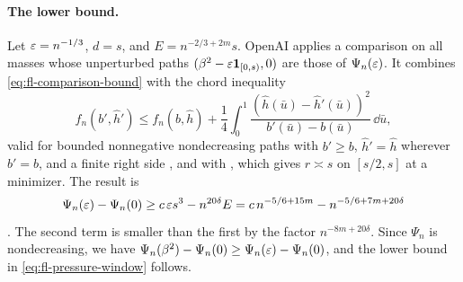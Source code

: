\paragraph{The lower bound.} Let $\varepsilon=n^{-1/3}$, $d=s$, and $E=n^{-2/3+2m}s$. OpenAI applies a comparison on all masses whose unperturbed paths $(\beta^2-\varepsilon\mathbf 1_{[0,s)},0)$ are those of $\Psi_n(\varepsilon)$. It combines \eqref{eq:fl-comparison-bound} with the chord inequality
\[
 f_n(b',{\widehat h}')\le f_n(b,{\widehat h})+\frac14\int_0^1\frac{({\widehat h}({\bar u})-{\widehat h}'({\bar u}))^2}{b'({\bar u})-b({\bar u})}\,\dd {\bar u},
\]
valid for bounded nonnegative nondecreasing paths with $b'\ge b$, ${\widehat h}'={\widehat h}$ wherever $b'=b$, and a finite right side \cite[Lemma~7.1]{oai-fluctuations}, and with \cite[Proposition~6.6]{oai-fluctuations}, which gives $r\asymp s$ on $[s/2,s]$ at a minimizer. The result is
\[
 \Psi_n(\varepsilon)-\Psi_n(0)\ge c\,\varepsilon s^3-n^{20\delta}E=c\,n^{-5/6+15m}-n^{-5/6+7m+20\delta}
\]
\cite[Section~7.1, (30)]{oai-fluctuations}. The second term is smaller than the first by the factor $n^{-8m+20\delta}$. Since $\Psi_n$ is nondecreasing, we have $\Psi_n(\beta^2)-\Psi_n(0)\ge\Psi_n(\varepsilon)-\Psi_n(0)$, and the lower bound in \eqref{eq:fl-pressure-window} follows.

